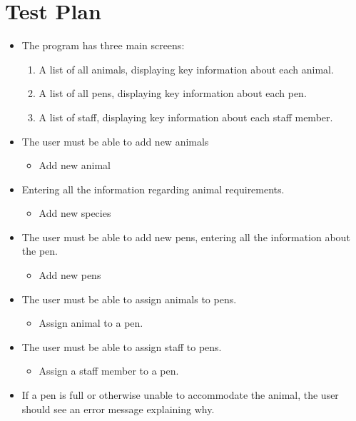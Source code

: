 \documentclass[english,a4paper,]{report}
\providecommand{\tightlist}{%
  \setlength{\itemsep}{0pt}\setlength{\parskip}{0pt}}
\begin{document}
\hypertarget{test-plan}{%
\chapter{Test Plan}\label{test-plan}}

\begin{itemize}
\tightlist
\item
  The program has three main screens:

  \begin{enumerate}
  \def\labelenumi{\arabic{enumi}.}
  \tightlist
  \item
    A list of all animals, displaying key information about each animal.
  \item
    A list of all pens, displaying key information about each pen.
  \item
    A list of staff, displaying key information about each staff member.
  \end{enumerate}
\item
  The user must be able to add new animals

  \begin{itemize}
  \tightlist
  \item
    Add new animal
  \end{itemize}
\item
  Entering all the information regarding animal requirements.

  \begin{itemize}
  \tightlist
  \item
    Add new species
  \end{itemize}
\item
  The user must be able to add new pens, entering all the information
  about the pen.

  \begin{itemize}
  \tightlist
  \item
    Add new pens
  \end{itemize}
\item
  The user must be able to assign animals to pens.

  \begin{itemize}
  \tightlist
  \item
    Assign animal to a pen.
  \end{itemize}
\item
  The user must be able to assign staff to pens.

  \begin{itemize}
  \tightlist
  \item
    Assign a staff member to a pen.
  \end{itemize}
\item
  If a pen is full or otherwise unable to accommodate the animal, the
  user should see an error message explaining why.


\end{itemize}
\end{document}
